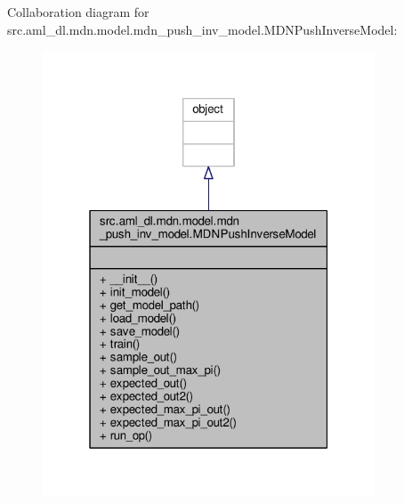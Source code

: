 Collaboration diagram for src.\-aml\-\_\-dl.\-mdn.\-model.\-mdn\-\_\-push\-\_\-inv\-\_\-model.\-M\-D\-N\-Push\-Inverse\-Model\-:
\nopagebreak
\begin{figure}[H]
\begin{center}
\leavevmode
\includegraphics[width=280pt]{classsrc_1_1aml__dl_1_1mdn_1_1model_1_1mdn__push__inv__model_1_1_m_d_n_push_inverse_model__coll__graph}
\end{center}
\end{figure}
